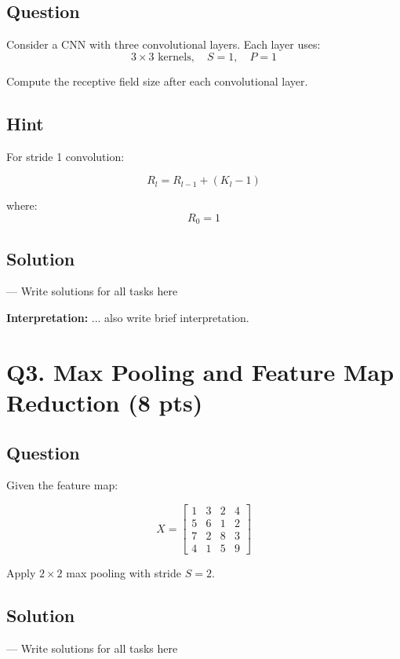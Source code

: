 \documentclass[11pt]{article}
\begin{document}
\subsection*{Question}

Consider a CNN with three convolutional layers. Each layer uses:
\[
3 \times 3 \text{ kernels}, \quad S=1, \quad P=1
\]

Compute the receptive field size after each convolutional layer.

\subsection*{Hint}

For stride 1 convolution:

\[
R_l=R_{l-1}+(K_l-1)
\]

where:
\[
R_0=1
\]

\subsection*{Solution}

--- Write solutions for all tasks here 

\noindent \textbf{Interpretation:} ... also write brief interpretation.

\section*{Q3. Max Pooling and Feature Map Reduction (8 pts)}

\subsection*{Question}

Given the feature map:

\[
X=
\begin{bmatrix}
1 & 3 & 2 & 4\\
5 & 6 & 1 & 2\\
7 & 2 & 8 & 3\\
4 & 1 & 5 & 9
\end{bmatrix}
\]

Apply \(2 \times 2\) max pooling with stride \(S=2\).

\subsection*{Solution}

--- Write solutions for all tasks here 
\end{document}
